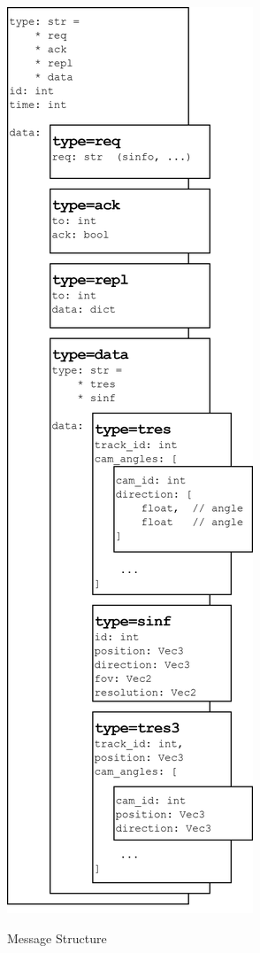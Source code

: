 \begin{figure}[H]
\begin{minipage}{0.38\textwidth}
		\includegraphics[width=\textwidth]{figures/SS_Protocol_Message}
		\caption{Message Structure}
		\label{fig:ssprotocolmessage}
	\end{minipage}
\end{figure}

